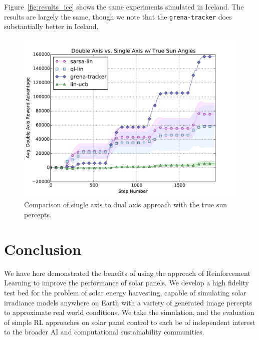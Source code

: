 \documentclass{article}
\begin{document}
{Figure~\ref{fig:results_ice} shows the same experiments simulated in Iceland. The results are largely the same, though we note that the \texttt{grena-tracker} does substantially better in Iceland.






\begin{figure}[h]
\begin{center}
\includegraphics[scale=0.26]{figures/saxis_vs_daxis_true}
\caption{Comparison of single axis to dual axis approach with the true sun percepts.}
\label{fig:results_axis}
\end{center}
\end{figure}






\section{Conclusion}

We have here demonstrated the benefits of using the approach of Reinforcement Learning to improve the performance of solar panels. We develop a high fidelity test bed for the problem of solar energy harvesting, capable of simulating solar irradiance models anywhere on Earth with a variety of generated image percepts to approximate real world conditions. We take the simulation, and the evaluation of simple RL approaches on solar panel control to each be of independent interest to the broader AI and computational sustainability communities.

}
\end{document}
